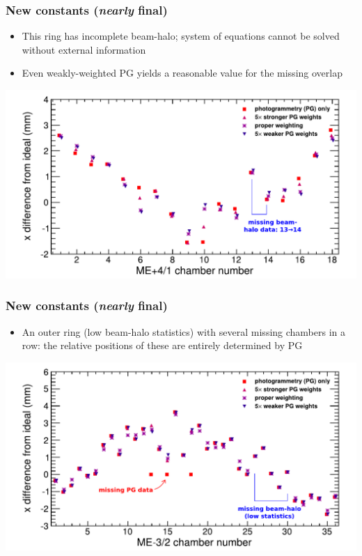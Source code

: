 \documentclass[compress]{beamer}
\begin{document}
\begin{frame}
\frametitle{New constants ({\it nearly} final)}

\begin{itemize}
\item This ring has incomplete beam-halo; system of equations cannot
  be solved without external information
\item Even weakly-weighted PG yields a reasonable value for the
  missing overlap
\end{itemize}

\includegraphics[width=\linewidth]{dependence_on_weights_p41.pdf}
\end{frame}

\begin{frame}
\frametitle{New constants ({\it nearly} final)}

\begin{itemize}
\item An outer ring (low beam-halo statistics) with several missing
  chambers in a row: the relative positions of these are entirely
  determined by PG
\end{itemize}

\includegraphics[width=\linewidth]{dependence_on_weights_32.pdf}
\end{frame}
\end{document}
